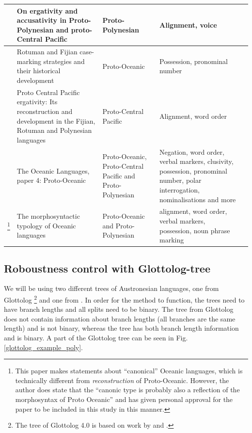 \documentclass[a4paper,10pt]{article} %
\begin{document}
\begin{longtable}{|p{3cm}|  p{5cm}| p{4cm} | p{3cm}  | p{3cm} |}
\citet{ball2007ergativity} & On ergativity and accusativity in Proto-Polynesian and proto-Central Pacific&Proto-Polynesian & Alignment, voice \\ \hline

\citet{kikusawa2001rotuman} & Rotuman and Fijian case-marking strategies and their historical development  & Proto-Oceanic & Possession, pronominal number \\ \hline

\citet{kikusawa2002proto}  & Proto Central Pacific ergativity: Its reconstruction and development in the Fijian, Rotuman and Polynesian languages & Proto-Central Pacific   & Alignment, word order \\ \hline

\citet{lynchrosscrowley_proto_grammar_oceanic} & The Oceanic Languages, paper 4: Proto-Oceanic & Proto-Oceanic, Proto-Central Pacific and Proto-Polynesian & Negation, word order, verbal markers, clusivity, possession, pronominal number, polar interrogation, nominalisations and more \\ \hline

\citet{ross2004morphosyntactic}\footnote{This paper makes statements about ``canonical'' Oceanic languages, which is technically different from \emph{reconstruction} of Proto-Oceanic. However, the author does state that the ``canonic type is probably also a reflection of the morphosyntax of Proto Oceanic'' \citep[492]{ross2004morphosyntactic} and has given personal approval for the paper to be included in this study in this manner.}  & The morphosyntactic typology of Oceanic languages &  Proto-Oceanic and Proto-Polynesian  & alignment, word order, verbal markers, possession, noun phrase marking \\ \hline
\end{longtable}



\subsection{Roboustness control with Glottolog-tree}


We will be using two different trees of Austronesian languages, one from Glottolog \citep{glottolog40}\footnote{The tree of Glottolog 4.0 is based on work by \citet{blust_2009, blust_2014} and \citet{blust_chen_2017}.} and one from \citet{grayetal_2009}. In order for the method to function, the trees need to have branch lengths and all splits need to be binary. The tree from Glottolog does not contain information about branch lengths (all branches are the same length) and is not binary, whereas the \citet{grayetal_2009} tree has both branch length information and is binary. A part of the Glottolog tree can be seen in Fig. \ref{glottolog_example_poly}.
\end{document}
